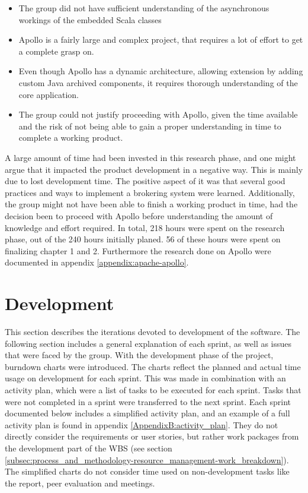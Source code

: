 \begin{itemize}
\item The group did not have sufficient understanding of the asynchronous workings of the embedded Scala classes
\item Apollo is a fairly large and complex project, that requires a lot of effort to get a complete grasp on.
\item Even though Apollo has a dynamic architecture, allowing extension by adding custom Java archived components, it requires thorough understanding of the core application.
\item The group could not justify proceeding with Apollo, given the time available and the risk of not being able to gain a proper understanding in time to complete a working product.
\end{itemize}

A large amount of time had been invested in this research phase, and one might argue that it impacted the product development in a negative way. This is mainly due to lost development time. The positive aspect of it was that several good practices and ways to implement a brokering system were learned. Additionally, the group might not have been able to finish a working product in time, had the decision been to proceed with Apollo before understanding the amount of knowledge and effort required. In total, 218 hours were spent on the research phase, out of the 240 hours initially planed. 56 of these hours were spent on finalizing chapter 1 and 2. Furthermore the research done on Apollo were documented in appendix \ref{appendix:apache-apollo}.  

\section{Development}
\label{subsec:project_lifecycle-development}

This section describes the iterations devoted to development of the software. The following section includes a general explanation of each sprint, as well as issues that were faced by the group. With the development phase of the project, burndown charts were introduced. The charts reflect the planned and actual time usage on development for each sprint. This was made in combination with an activity plan, which were a list of tasks to be executed for each sprint. Tasks that were not completed in a sprint were transferred to the next sprint. Each sprint documented below includes a simplified activity plan, and an example of a full activity plan is found in appendix \ref{AppendixB:activity_plan}. They do not directly consider the requirements or user stories, but rather work packages from the development part of the WBS (see section \ref{subsec:process_and_methodology-resource_management-work_breakdown}).  The simplified charts do not consider time used on non-development tasks like the report, peer evaluation and meetings.

